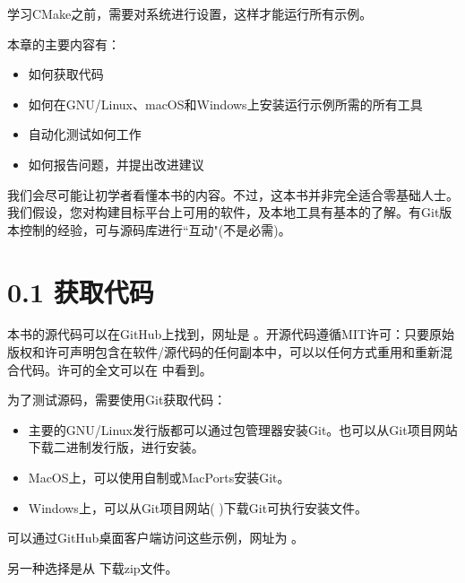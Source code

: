 学习CMake之前，需要对系统进行设置，这样才能运行所有示例。

本章的主要内容有：

\begin{itemize}
\item 如何获取代码

\item 如何在GNU/Linux、macOS和Windows上安装运行示例所需的所有工具

\item 自动化测试如何工作

\item 如何报告问题，并提出改进建议

\end{itemize}

我们会尽可能让初学者看懂本书的内容。不过，这本书并非完全适合零基础人士。我们假设，您对构建目标平台上可用的软件，及本地工具有基本的了解。有Git版本控制的经验，可与源码库进行“互动"(不是必需)。


\section{0.1 获取代码}

本书的源代码可以在GitHub上找到，网址是  。开源代码遵循MIT许可：只要原始版权和许可声明包含在软件/源代码的任何副本中，可以以任何方式重用和重新混合代码。许可的全文可以在  中看到。

为了测试源码，需要使用Git获取代码：

\begin{itemize}
\item 主要的GNU/Linux发行版都可以通过包管理器安装Git。也可以从Git项目网站  下载二进制发行版，进行安装。

\item MacOS上，可以使用自制或MacPorts安装Git。

\item Windows上，可以从Git项目网站(  )下载Git可执行安装文件。

\end{itemize}

可以通过GitHub桌面客户端访问这些示例，网址为  。

另一种选择是从  下载zip文件。

